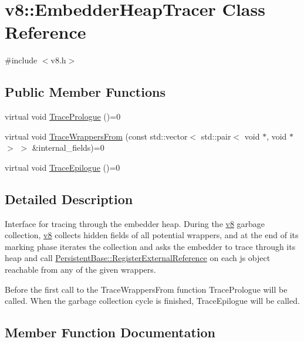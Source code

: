 \hypertarget{classv8_1_1EmbedderHeapTracer}{}\section{v8\+:\+:Embedder\+Heap\+Tracer Class Reference}
\label{classv8_1_1EmbedderHeapTracer}


{\ttfamily \#include $<$v8.\+h$>$}

\subsection*{Public Member Functions}
\begin{DoxyCompactItemize}
\item 
virtual void \hyperlink{classv8_1_1EmbedderHeapTracer_af4f747aa1d77a0d2f341846b94f6b1ce}{Trace\+Prologue} ()=0
\item 
virtual void \hyperlink{classv8_1_1EmbedderHeapTracer_a94aa3bb3651e969f0f0726ee1c79cc3c}{Trace\+Wrappers\+From} (const std\+::vector$<$ std\+::pair$<$ void $\ast$, void $\ast$ $>$ $>$ \&internal\+\_\+fields)=0
\item 
virtual void \hyperlink{classv8_1_1EmbedderHeapTracer_a61b8dc3260247e2c47af8ad8f5775991}{Trace\+Epilogue} ()=0
\end{DoxyCompactItemize}


\subsection{Detailed Description}
Interface for tracing through the embedder heap. During the \hyperlink{namespacev8}{v8} garbage collection, \hyperlink{namespacev8}{v8} collects hidden fields of all potential wrappers, and at the end of its marking phase iterates the collection and asks the embedder to trace through its heap and call \hyperlink{classv8_1_1PersistentBase_a14c051e0080bbe7fbe02be35865b9923}{Persistent\+Base\+::\+Register\+External\+Reference} on each js object reachable from any of the given wrappers.

Before the first call to the Trace\+Wrappers\+From function Trace\+Prologue will be called. When the garbage collection cycle is finished, Trace\+Epilogue will be called. 

\subsection{Member Function Documentation}
